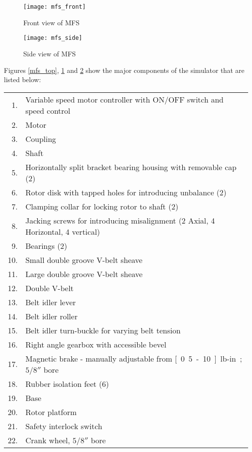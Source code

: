 \documentclass[a4paper,11pt]{report}
\begin{document}
\clearpage

\begin{figure}[t] 
\centering
\texttt{[image: mfs\_front]}
\caption{Front view of MFS} \label{mfs_front}
\end{figure} 

\begin{figure}[b] 
\centering
\texttt{[image: mfs\_side]}
\caption{Side view of MFS} \label{mfs_side}
\end{figure} 

\clearpage
Figures \ref{mfs_top}, \ref{mfs_front} and \ref{mfs_side} show the major components of the simulator that are listed below:\\ 

\begin{tabular}{rl}
1. & Variable speed motor controller with ON/OFF switch and speed control \\
2. & Motor\\
3. & Coupling \\
4. & Shaft \\
5. & Horizontally split bracket bearing housing with removable cap (2)\\
6. & Rotor disk with tapped holes for introducing unbalance (2)\\
7. & Clamping collar for locking rotor to shaft (2)\\
8. & Jacking screws for introducing misalignment (2 Axial, 4 Horizontal, 4 vertical) \\
9. & Bearings (2)\\
10. & Small double groove V-belt sheave\\
11. & Large double groove V-belt sheave\\
12. & Double V-belt\\
13. & Belt idler lever\\
14. & Belt idler roller\\
15. & Belt idler turn-buckle for varying belt tension\\
16. & Right angle gearbox with accessible bevel\\
17. & Magnetic brake - manually adjustable from \unit[0.5-10]{lb-in}; $5/8''$ bore \\
18. & Rubber isolation feet (6)\\
19. & Base\\
20. & Rotor platform \\
21. & Safety interlock switch\\
22. & Crank wheel, $5/8''$ bore\\

\end{tabular}
\end{document}
